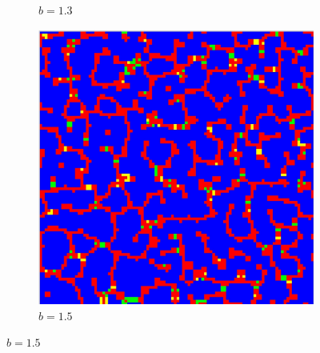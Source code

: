 \documentclass[12pt]{article}
\begin{document}
\begin{figure}[!htbp]
\begin{subfigure}{.33\textwidth}
          \caption{$b=1.3$}
          \label{fig:sub2}
        \end{subfigure}%
        \begin{subfigure}{.33\textwidth}
          \centering
          \includegraphics[width=.9\linewidth]{MeanFieldGame/snapshot_b=15.jpg}
          \caption{$b=1.5$}
          \label{fig:sub3}
        \end{subfigure}
        

\end{figure}
\end{document}
